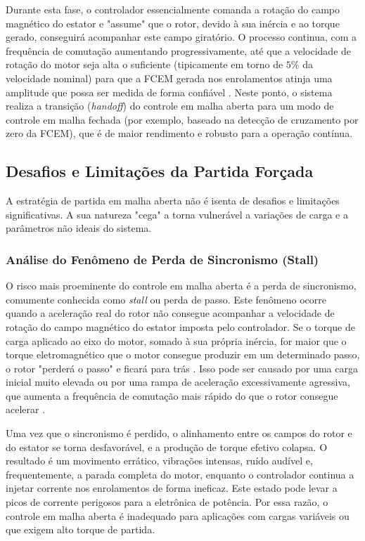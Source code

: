 Durante esta fase, o controlador essencialmente comanda a rotação do campo magnético do estator e "assume" que o rotor, devido à sua inércia e ao torque gerado, conseguirá acompanhar este campo giratório. O processo continua, com a frequência de comutação aumentando progressivamente, até que a velocidade de rotação do motor seja alta o suficiente (tipicamente em torno de $5\%$ da velocidade nominal) para que a FCEM gerada nos enrolamentos atinja uma amplitude que possa ser medida de forma confiável \cite{ti2022minimizing, nxp2023sensorless}. Neste ponto, o sistema realiza a transição (\textit{handoff}) do controle em malha aberta para um modo de controle em malha fechada (por exemplo, baseado na detecção de cruzamento por zero da FCEM), que é de maior rendimento e robusto para a operação contínua.

\subsection{Desafios e Limitações da Partida Forçada}

A estratégia de partida em malha aberta não é isenta de desafios e limitações significativas. A sua natureza "cega" a torna vulnerável a variações de carga e a parâmetros não ideais do sistema.

\subsubsection{Análise do Fenômeno de Perda de Sincronismo (Stall)}

O risco mais proeminente do controle em malha aberta é a perda de sincronismo, comumente conhecida como \textit{stall} ou perda de passo. Este fenômeno ocorre quando a aceleração real do rotor não consegue acompanhar a velocidade de rotação do campo magnético do estator imposta pelo controlador. Se o torque de carga aplicado ao eixo do motor, somado à sua própria inércia, for maior que o torque eletromagnético que o motor consegue produzir em um determinado passo, o rotor "perderá o passo" e ficará para trás \cite{nxp2023sensorless}. Isso pode ser causado por uma carga inicial muito elevada ou por uma rampa de aceleração excessivamente agressiva, que aumenta a frequência de comutação mais rápido do que o rotor consegue acelerar \cite{ti2022minimizing}.

Uma vez que o sincronismo é perdido, o alinhamento entre os campos do rotor e do estator se torna desfavorável, e a produção de torque efetivo colapsa. O resultado é um movimento errático, vibrações intensas, ruído audível e, frequentemente, a parada completa do motor, enquanto o controlador continua a injetar corrente nos enrolamentos de forma ineficaz. Este estado pode levar a picos de corrente perigosos para a eletrônica de potência. Por essa razão, o controle em malha aberta é inadequado para aplicações com cargas variáveis ou que exigem alto torque de partida.

